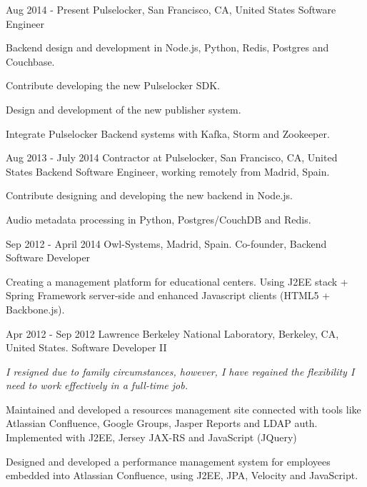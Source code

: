 
\experience
  {Aug 2014 - Present}
  {Pulselocker, San Francisco, CA, United States}
  {Software Engineer}
  {\vspace{-1em}\begin{rlist}
    \item Backend design and development in Node.js, Python, Redis, Postgres and Couchbase.
    \item Contribute developing the new Pulselocker SDK.
    \item Design and development of the new publisher system.
    \item Integrate Pulselocker Backend systems with Kafka, Storm and Zookeeper.
  \end{rlist}}

\experience
  {Aug 2013 - July 2014}
  {Contractor at Pulselocker, San Francisco, CA, United States}
  {Backend Software Engineer, working remotely from Madrid, Spain.}
  {\vspace{-1em}\begin{rlist}
    \item Contribute designing and developing the new backend in Node.js.
    \item Audio metadata processing in Python, Postgres/CouchDB and Redis.
  \end{rlist}}

\experience
  {Sep 2012 - April 2014}
  {Owl-Systems, Madrid, Spain.}
  {Co-founder, Backend Software Developer}
  {\vspace{-1em}\begin{rlist}
    \item Creating a management platform for educational centers. Using J2EE stack +
    Spring Framework server-side and enhanced Javascript clients (HTML5 +
    Backbone.js).
  \end{rlist}}

\experience
  {Apr 2012 - Sep 2012}
  {Lawrence Berkeley National Laboratory, Berkeley, CA, United States.}
  {Software Developer II}
  {\emph{I resigned due to family circumstances, however, I have
    regained the flexibility I need to work effectively in a full-time
    job.}
    \begin{rlist}
    \item Maintained and developed a resources management site
    connected with tools like Atlassian Confluence, Google Groups, Jasper
    Reports and LDAP auth. Implemented with J2EE, Jersey JAX-RS and
    JavaScript (JQuery)
    \item Designed and developed a performance management system for
    employees embedded into Atlassian Confluence, using J2EE, JPA,
    Velocity and JavaScript.
  \end{rlist}}

